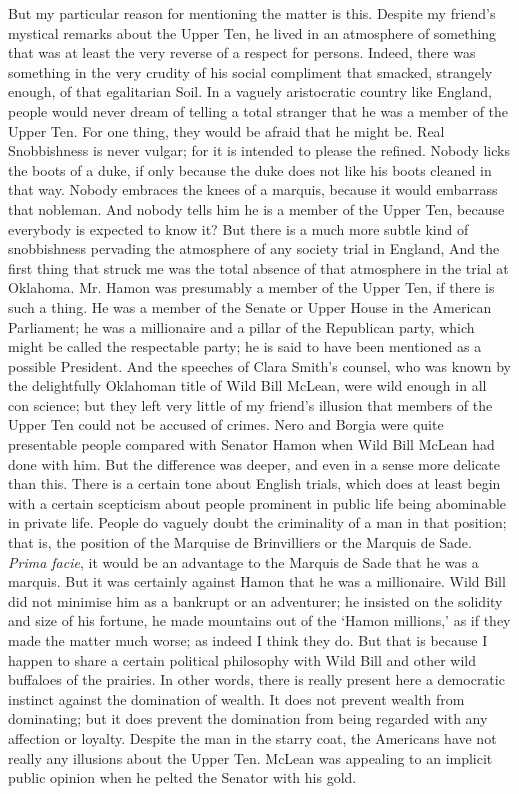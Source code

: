 \documentclass{book}
\begin{document}
But my particular reason for mentioning the matter is this. Despite my friend’s mystical remarks about the Upper Ten, he lived in an atmosphere of something that was at least the very reverse of a respect for persons. Indeed, there was something in the very crudity of his social compliment that smacked, strangely enough, of that egalitarian Soil. In a vaguely aristocratic country like England, people would never dream of telling a total stranger that he was a member of the Upper Ten. For one thing, they would be afraid that he might be. Real Snobbishness is never vulgar; for it is intended to please the refined. Nobody licks the boots of a duke, if only because the duke does not like his boots cleaned in that way. Nobody embraces the knees of a marquis, because it would embarrass that nobleman. And nobody tells him he is a member of the Upper Ten, because everybody is expected to know it? But there is a much more subtle kind of snobbishness pervading the atmosphere of any society trial in England, And the first thing that struck me was the total absence of that atmosphere in the trial at Oklahoma. Mr. Hamon was presumably a member of the Upper Ten, if there is such a thing. He was a member of the Senate or Upper House in the American Parliament; he was a millionaire and a pillar of the Republican party, which might be called the respectable party; he is said to have been mentioned as a possible President. And the speeches of Clara Smith’s counsel, who was known by the delightfully Oklahoman title of Wild Bill McLean, were wild enough in all con science; but they left very little of my friend’s illusion that members of the Upper Ten could not be accused of crimes. Nero and Borgia were quite presentable people compared with Senator Hamon when Wild Bill McLean had done with him. But the difference was deeper, and even in a sense more delicate than this. There is a certain tone about English trials, which does at least begin with a certain scepticism about people prominent in public life being abominable in private life. People do vaguely doubt the criminality of a man in that position; that is, the position of the Marquise de Brinvilliers or the Marquis de Sade. \emph{Prima facie}, it would be an advantage to the Marquis de Sade that he was a marquis. But it was certainly against Hamon that he was a millionaire. Wild Bill did not minimise him as a bankrupt or an adventurer; he insisted on the solidity and size of his fortune, he made mountains out of the ‘Hamon millions,’ as if they made the matter much worse; as indeed I think they do. But that is because I happen to share a certain political philosophy with Wild Bill and other wild buffaloes of the prairies. In other words, there is really present here a democratic instinct against the domination of wealth. It does not prevent wealth from dominating; but it does prevent the domination from being regarded with any affection or loyalty. Despite the man in the starry coat, the Americans have not really any illusions about the Upper Ten. McLean was appealing to an implicit public opinion when he pelted the Senator with his gold.
\end{document}
